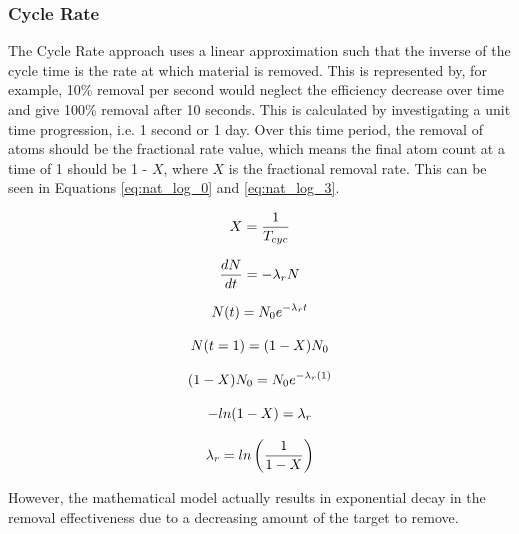 \subsubsection{Cycle Rate}

The Cycle Rate approach uses a linear approximation such that the inverse of the cycle time is the rate at which material is removed. This is represented by, for example, 10\% removal per second would neglect the efficiency decrease over time and give 100\% removal after 10 seconds. This is calculated by investigating a unit time progression, i.e. 1 second or 1 day. Over this time period, the removal of atoms should be the fractional rate value, which means the final atom count at a time of 1 should be 1 - $X$, where $X$ is the fractional removal rate. This can be seen in Equations \eqref{eq:nat_log_0} and \eqref{eq:nat_log_3}.

\begin{equation} \hfill
X = \frac{1}{T_{cyc}}
\hfill\label{eq:nat_log_0} \end{equation}

\begin{equation} \hfill
\frac{dN}{dt} = -\lambda_r N
\hfill\label{eq:nat_log_1} \end{equation}

\begin{equation} \hfill
N(t) = N_0 e^{-\lambda_r t}
\hfill\label{eq:nat_log_1} \end{equation}

\begin{equation} \hfill
N(t = 1) = (1-X) N_{0}
\hfill\label{eq:nat_log_2} \end{equation}

\begin{equation} \hfill
(1-X) N_{0} = N_{0} e^{-\lambda_r (1)}
\hfill\label{eq:nat_log_2_1} \end{equation}

\begin{equation} \hfill
-ln(1-X)  = \lambda_r
\hfill\label{eq:nat_log_2_5} \end{equation}

\begin{equation} \hfill
\lambda_r = ln\left( \frac{1}{1-X} \right)
\hfill\label{eq:nat_log_3} \end{equation}

However, the mathematical model actually results in exponential decay in the removal effectiveness due to a decreasing amount of the target to remove. %

